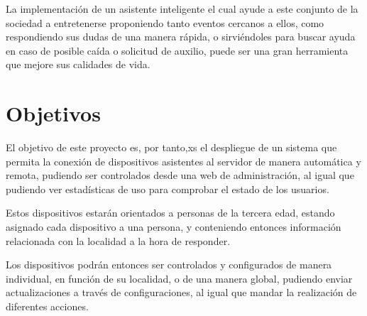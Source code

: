 La implementación de un asistente inteligente el cual ayude a este conjunto de la sociedad a entretenerse proponiendo tanto eventos cercanos a ellos, como respondiendo sus dudas de una manera rápida, o sirviéndoles para buscar ayuda en caso de posible caída o solicitud de auxilio, puede ser una gran herramienta que mejore sus calidades de vida.


\section{Objetivos}

El objetivo de este proyecto es, por tanto,xs el despliegue de un sistema que permita la conexión de dispositivos asistentes al servidor de manera automática y remota, pudiendo ser controlados desde una web de administración, al igual que pudiendo ver estadísticas de uso para comprobar el estado de los usuarios. 

Estos dispositivos estarán orientados a personas de la tercera edad, estando asignado cada dispositivo a una persona, y conteniendo entonces información relacionada con la localidad a la hora de responder.

Los dispositivos podrán entonces ser controlados y configurados de manera individual, en función de su localidad, o de una manera global, pudiendo enviar actualizaciones a través de configuraciones, al igual que mandar la realización de diferentes acciones.
